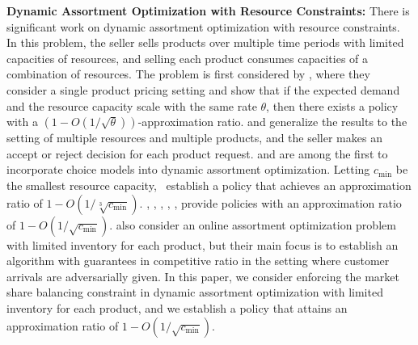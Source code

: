 \documentclass[mnsc,non-blindrev]{informs3}
\theoremstyle{definition}
\begin{document}
\noindent\textbf{Dynamic Assortment Optimization with Resource Constraints:} There is significant work on dynamic assortment optimization with resource constraints. In this problem, the seller sells products over multiple time periods with limited capacities of resources, and selling each product consumes capacities of a combination of resources. The problem is first considered by \cite{gallego1994optimal}, where they consider a single product pricing setting and show that if the expected demand and the resource capacity scale with the same rate $\theta$, then there exists a policy with a $(1-O(1/\sqrt{\theta}))$-approximation ratio. \cite{gallego1997multiproduct} and \cite{talluri1998analysis} generalize the results to the setting of multiple resources and multiple products, and the seller makes an accept or reject decision for each product request. \cite{gallego2004managing} and \cite{liu2008choice} are among the first to incorporate choice models into dynamic assortment optimization. Letting $c_{\min}$ be the smallest resource capacity, \cite{rusmevichientong2020dynamic}~establish a policy that achieves an approximation ratio of $1-O(1/\sqrt[3]{c_{\min}})$. \cite{ma2021dynamic}, \cite{bai2022coordinated}, \cite{feng2024near}, \cite{aouad2023nonparametric}, \cite{bai2023fluid}, \cite{li2024revenue} provide policies with an approximation ratio of $1-O(1/\sqrt{c_{\min}})$. \cite{golrezaei2014real} also consider an online assortment optimization problem with limited inventory for each product, but their main focus is to establish an algorithm with guarantees in competitive ratio in the setting where customer arrivals are adversarially given. In this paper, we consider enforcing the market share balancing constraint in dynamic assortment optimization with limited inventory for each product, and we establish a policy that attains an approximation ratio of $1-O(1/\sqrt{c_{\min}})$.
\end{document}
